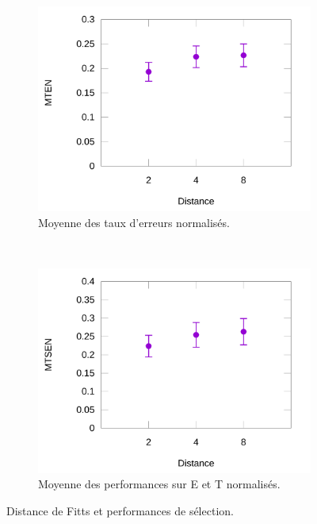 \begin{figure}[!htb]
\begin{subfigure}[t]{0.49\textwidth}
			\includegraphics[width=\textwidth]{figures/ch5/normErrors}
			\caption{Moyenne des taux d'erreurs normalisés.}
			\label{fig:normErrors}
		\end{subfigure}		
		~
		\begin{subfigure}[t]{0.49\textwidth}
			\centering
			\includegraphics[width=\textwidth]{figures/ch5/normProducts}
			\caption{Moyenne des performances sur E et T normalisés.}
			\label{fig:normProducts}
		\end{subfigure}
		\caption[Distance de Fitts et performances de sélection]{Distance de Fitts et performances de sélection.}
		\label{fig:fittsDistAndPerf}
	\end{figure}

